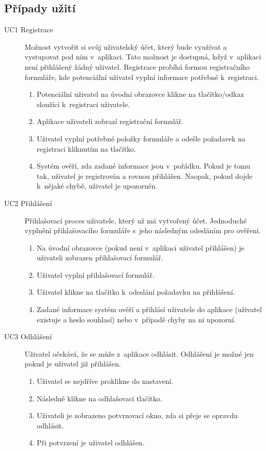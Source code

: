 \documentclass[thesis=M,czech]{FITthesis}[2019/12/23]
\begin{document}
\subsection*{Případy užití}
\begin{description}
    
    \item[UC1 Registrace] Možnost vytvořit si svůj uživatelský účet, který bude využívat a vystupovat pod ním v~aplikaci. Tato možnost je dostupná, když v~aplikaci není přihlášený žádný uživatel. Registrace probíhá formou registračního formuláře, kde potenciální uživatel vyplní informace potřebné k~registraci.
    \begin{enumerate}
        \item Potenciální uživatel na úvodní obrazovce klikne na tlačítko/odkaz sloužící k~registraci uživatele.
        \item Aplikace uživateli zobrazí registrační formulář.
        \item Uživatel vyplní potřebné položky formuláře a odešle požadavek na registraci kliknutím na tlačítko.
        \item Systém ověří, zda zadané informace jsou v~pořádku. Pokud je tomu tak, uživatel je registrován a rovnou přihlášen. Naopak, pokud dojde k~nějaké chybě, uživatel je upozorněn.
    \end{enumerate}
    
    \item[UC2 Přihlášení] Přihlašovací proces uživatele, který už má vytvořený účet. Jednoduché vyplnění přihlašovacího formuláře s~jeho následným odesláním pro ověření.
    \begin{enumerate}
        \item Na úvodní obrazovce (pokud není v~aplikaci uživatel přihlášen) je uživateli zobrazen přihlašovací formulář.
        \item Uživatel vyplní přihlašovací formulář.
        \item Uživatel klikne na tlačítko k~odeslání požadavku na přihlášení.
        \item Zadané informace systém ověří a přihlásí uživatele do aplikace (uživatel existuje a heslo souhlasí) nebo v~případě chyby na ni upozorní.
    \end{enumerate}
    
    \item[UC3 Odhlášení] Uživatel očekává, že se může z~aplikace odhlásit. Odhlášení je možné jen pokud je uživatel již přihlášen.
    \begin{enumerate}
        \item Uživatel se nejdříve proklikne do nastavení.
        \item Následně klikne na odhlašovací tlačítko.
        \item Uživateli je zobrazeno potvrzovací okno, zda si přeje se opravdu odhlásit.
        \item Při potvrzení je uživatel odhlášen.
    \end{enumerate}
    

\end{description}
\end{document}
